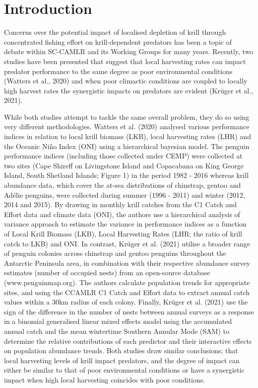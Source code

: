 \documentclass[]{elsarticle} %
\begin{document}
\hypertarget{introduction}{%
\section{Introduction}\label{introduction}}

Concerns over the potential impact of localised depletion of krill
through concentrated fishing effort on krill-dependent predators has
been a topic of debate within SC-CAMLR and its Working Groups for many
years. Recently, two studies have been presented that suggest that local
harvesting rates can impact predator performance to the same degree as
poor environmental conditions (Watters et al., 2020) and when poor
climactic conditions are coupled to locally high harvest rates the
synergistic impacts on predators are evident (Krüger et al., 2021).

While both studies attempt to tackle the same overall problem, they do
so using very different methodologies. Watters et al. (2020) analysed
various performance indices in relation to local krill biomass (LKB),
local harvesting rates (LHR) and the Oceanic Niño Index (ONI) using a
hierarchical bayesian model. The penguin performance indices (including
those collected under CEMP) were collected at two sites (Cape Shireff on
Livingstone Island and Copacabana on King George Island, South Shetland
Islands; Figure 1) in the period 1982 - 2016 whereas krill abundance
data, which cover the at-sea distributions of chinstrap, gentoo and
Adélie penguins, were collected during summer (1996 - 2011) and winter
(2012, 2014 and 2015). By drawing in monthly krill catches from the C1
Catch and Effort data and climate data (ONI), the authors use a
hierarchical analysis of variance approach to estimate the variance in
performance indices as a function of Local Krill Biomass (LKB), Local
Harvesting Rates (LHR; the ratio of krill catch to LKB) and ONI. In
contrast, Krüger et al. (2021) utilise a broader range of penguin
colonies across chinstrap and gentoo penguins throughout the Antarctic
Peninsula area, in combination with their respective abundance survey
estimates (number of occupied nests) from an open-source database
(www.penguinmap.org). The authors calculate population trends for
appropriate sites, and using the CCAMLR C1 Catch and Effort data to
extract annual catch values within a 30km radius of each colony.
Finally, Krüger et al. (2021) use the sign of the difference in the
number of nests between annual surveys as a response in a binomial
generalised linear mixed effects model using the accumulated annual
catch and the mean wintertime Southern Annular Mode (SAM) to determine
the relative contributions of each predictor and their interactive
effects on population abundance trends. Both studies draw similar
conclusions; that local harvesting levels of krill impact predators, and
the degree of impact can either be similar to that of poor environmental
conditions or have a synergistic impact when high local harvesting
coincides with poor conditions.
\end{document}
